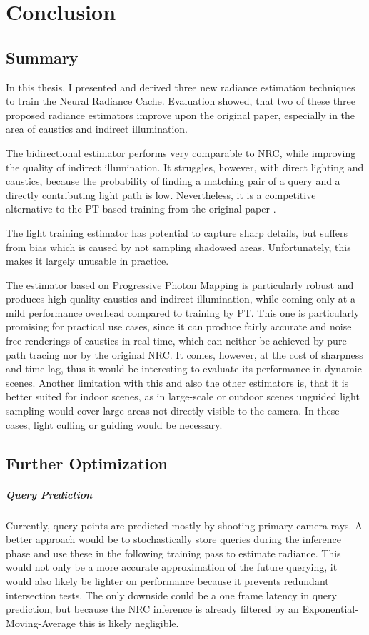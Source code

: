 
\chapter{Conclusion}
\label{chap:conclusion}

\section{Summary}
In this thesis, I presented and derived three new radiance estimation techniques to train the Neural Radiance Cache.
Evaluation showed, that two of these three proposed radiance estimators improve upon the original paper, especially in the area of caustics and indirect illumination.

The bidirectional estimator performs very comparable to NRC, while improving the quality of indirect illumination.
It struggles, however, with direct lighting and caustics, because the probability of finding a matching pair of a query and a directly contributing light path is low.
Nevertheless, it is a competitive alternative to the PT-based training from the original paper \parencite{muller2021}.

The light training estimator has potential to capture sharp details, but suffers from bias which is caused by not sampling shadowed areas.
Unfortunately, this makes it largely unusable in practice.

The estimator based on Progressive Photon Mapping is particularly robust and produces high quality caustics and indirect illumination, while coming only at a mild performance overhead compared to training by PT.
This one is particularly promising for practical use cases, since it can produce fairly accurate and noise free renderings of caustics in real-time, which can neither be achieved by pure path tracing nor by the original NRC.
It comes, however, at the cost of sharpness and time lag, thus it would be interesting to evaluate its performance in dynamic scenes.
Another limitation with this and also the other estimators is, that it is better suited for indoor scenes, as in large-scale or outdoor scenes unguided light sampling would cover large areas not directly visible to the camera.
In these cases, light culling or guiding would be necessary.

\section{Further Optimization}

\paragraph{Query Prediction}
Currently, query points are predicted mostly by shooting primary camera rays.
A better approach would be to stochastically store queries during the inference phase and use these in the following training pass to estimate radiance.
This would not only be a more accurate approximation of the future querying, it would also likely be lighter on performance because it prevents redundant intersection tests.
The only downside could be a one frame latency in query prediction, but because the NRC inference is already filtered by an Exponential-Moving-Average this is likely negligible.

